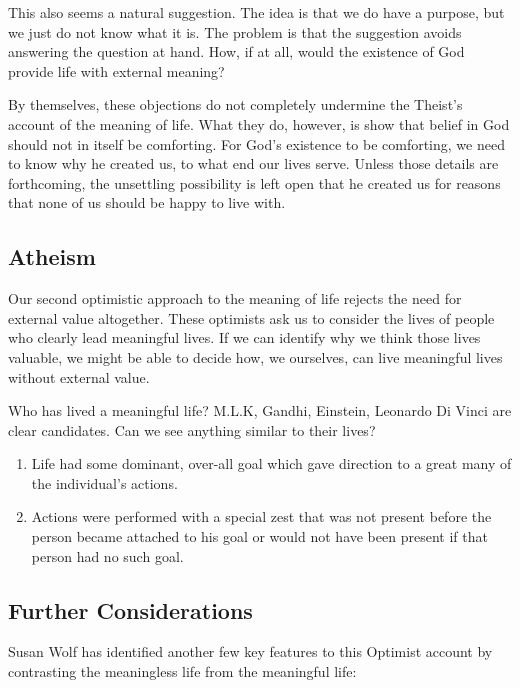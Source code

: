 \documentclass[]{article}
\providecommand{\tightlist}{%
  \setlength{\itemsep}{0pt}\setlength{\parskip}{0pt}}
\begin{document}
This also seems a natural suggestion. The idea is that we do have a
purpose, but we just do not know what it is. The problem is that the
suggestion avoids answering the question at hand. How, if at all, would
the existence of God provide life with external meaning?

By themselves, these objections do not completely undermine the Theist's
account of the meaning of life. What they do, however, is show that
belief in God should not in itself be comforting. For God's existence to
be comforting, we need to know why he created us, to what end our lives
serve. Unless those details are forthcoming, the unsettling possibility
is left open that he created us for reasons that none of us should be
happy to live with.

\subsection{Atheism}\label{atheism}

Our second optimistic approach to the meaning of life rejects the need
for external value altogether. These optimists ask us to consider the
lives of people who clearly lead meaningful lives. If we can identify
why we think those lives valuable, we might be able to decide how, we
ourselves, can live meaningful lives without external value.

Who has lived a meaningful life? M.L.K, Gandhi, Einstein, Leonardo Di
Vinci are clear candidates. Can we see anything similar to their lives?

\begin{enumerate}
\def\labelenumi{\arabic{enumi}.}
\tightlist
\item
  Life had some dominant, over-all goal which gave direction to a great
  many of the individual's actions.
\item
  Actions were performed with a special zest that was not present before
  the person became attached to his goal or would not have been present
  if that person had no such goal.
\end{enumerate}

\subsection{Further Considerations}\label{further-considerations}

Susan Wolf has identified another few key features to this Optimist
account by contrasting the meaningless life from the meaningful life:
\end{document}
